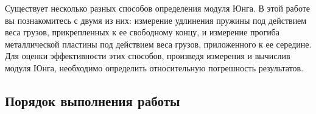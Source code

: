 \documentclass[a4paper, 12pt]{extarticle}
\begin{document}
Существует несколько разных способов определения модуля Юнга. В этой работе вы познакомитесь с двумя из них: измерение удлинения пружины под действием веса грузов, прикрепленных к ее свободному концу, и измерение прогиба металлической пластины под действием веса грузов, приложенного к ее середине. Для оценки эффективности этих способов, произведя измерения и вычислив модуля Юнга, необходимо определить относительную погрешность результатов. %

\subsection{Порядок выполнения работы}

\begin{figure}[h]
\begin{center}
\end{center}
\caption{\label{fig:m9b-equipment}}
\end{figure}
\end{document}
